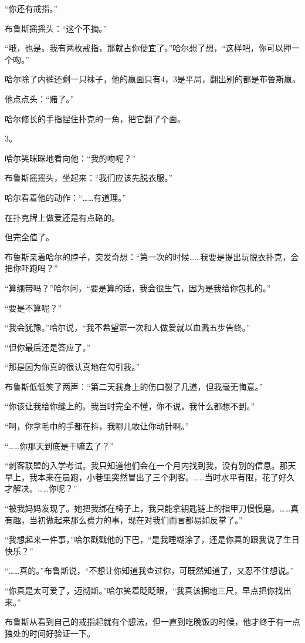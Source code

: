 \documentclass[../main]{subfiles}
\begin{document}
“你还有戒指。”

布鲁斯摇摇头：“这个不摘。”

“哦，也是。我有两枚戒指，那就占你便宜了。”哈尔想了想，“这样吧，你可以押一个吻。”

哈尔除了内裤还剩一只袜子，他的赢面只有4，3是平局，翻出别的都是布鲁斯赢。

他点点头：“赌了。”

哈尔修长的手指捏住扑克的一角，把它翻了个面。

3。

哈尔笑眯眯地看向他：“我的吻呢？”

布鲁斯摇摇头，坐起来：“我们应该先脱衣服。”

哈尔看着他的动作：“……有道理。”

在扑克牌上做爱还是有点硌的。

但完全值了。

布鲁斯亲着哈尔的脖子，突发奇想：“第一次的时候……我要是提出玩脱衣扑克，会把你吓跑吗？”

“算绷带吗？”哈尔问，“要是算的话，我会很生气，因为是我给你包扎的。”

“要是不算呢？”

“我会犹豫。”哈尔说，“我不希望第一次和人做爱就以血溅五步告终。”

“但你最后还是答应了。”

“那是因为你真的很认真地在勾引我。”

布鲁斯低低笑了两声：“第二天我身上的伤口裂了几道，但我毫无悔意。”

“你该让我给你缝上的。我当时完全不懂，你不说，我什么都想不到。”

“呵，你拿毛巾的手都在抖，我哪儿敢让你动针啊。”

“……你那天到底是干嘛去了？”

“刺客联盟的入学考试。我只知道他们会在一个月内找到我，没有别的信息。那天早上，我本来在晨跑，小巷里突然冒出了三个刺客。……当时水平有限，花了好久才解决。……你呢？”

“被我妈妈发现了。她把我绑在椅子上，我只能拿钥匙链上的指甲刀慢慢磨。……真有趣，当初做起来那么费力的事，现在对我们而言都易如反掌了。”

“我想起来一件事，”哈尔戳戳他的下巴，“是我睡糊涂了，还是你真的跟我说了生日快乐？”

“……真的。”布鲁斯说，“不想让你知道我查过你，可既然知道了，又忍不住想说。”

“你真是太可爱了，迈彻斯。”哈尔笑着眨眨眼，“我真该掘地三尺，早点把你找出来。”

布鲁斯从看到自己的戒指起就有个想法，但一直到吃晚饭的时候，他才终于有一点独处的时间好验证一下。
\end{document}
